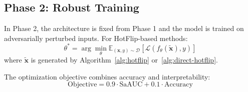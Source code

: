 \documentclass[11pt]{article}
\newcommand{\x}{\mathbf{x}}
\newcommand{\loss}{\mathcal{L}}
\newcommand{\model}{f_\theta}
\newcommand{\E}{\mathbb{E}}
\theoremstyle{definition}
\begin{document}
\subsection{Phase 2: Robust Training}

In Phase 2, the architecture is fixed from Phase 1 and the model is trained on adversarially perturbed inputs. For HotFlip-based methods:
\begin{equation}
    \theta^* = \arg\min_\theta \E_{(\x,y) \sim \mathcal{D}} \left[ \loss(\model(\tilde{\x}), y) \right]
\end{equation}
where $\tilde{\x}$ is generated by Algorithm~\ref{alg:hotflip} or~\ref{alg:direct-hotflip}.

The optimization objective combines accuracy and interpretability:
\begin{equation}
    \text{Objective} = 0.9 \cdot \text{SaAUC} + 0.1 \cdot \text{Accuracy}
\end{equation}
\end{document}
